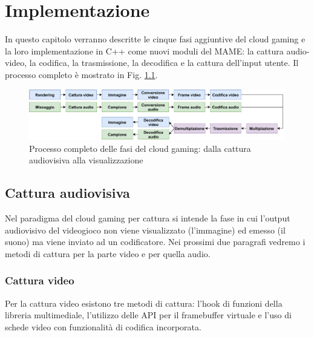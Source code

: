 %
%
\chapter{Implementazione}
In questo capitolo verranno descritte le cinque fasi aggiuntive del cloud gaming e la loro implementazione in C++ come nuovi moduli del MAME: la cattura audio-video, la codifica, la trasmissione, la decodifica e la cattura dell'input utente. Il processo completo è mostrato in Fig. \ref{fig:decodificaFilmato}.

\begin{figure}[H]
	\includegraphics[width=\linewidth]{immagini/decodificaFilmato}
	\caption{Processo completo delle fasi del cloud gaming: dalla cattura audiovisiva alla visualizzazione}
	\label{fig:decodificaFilmato}
\end{figure}




\section{Cattura audiovisiva}
Nel paradigma del cloud gaming per cattura si intende la fase in cui l'output audiovisivo del videogioco non viene visualizzato (l'immagine) ed emesso (il suono) ma viene inviato ad un codificatore. Nei prossimi due paragrafi vedremo i metodi di cattura per la parte video e per quella audio.


\subsection{Cattura video} \label{subsec:cap3_Video}
Per la cattura video esistono tre metodi di cattura: l'hook di funzioni della libreria multimediale, l'utilizzo delle API per il framebuffer virtuale e l'uso di schede video con funzionalità di codifica incorporata.

